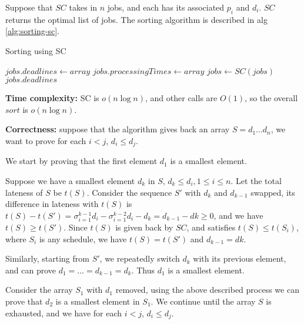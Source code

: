 \documentclass{article}
\begin{document}
\begin{description}
  Suppose that $SC$ takes in $n$ jobs, and each has its associated $p_i$ and $d_i$. $SC$ returns the optimal list of jobs. The sorting algorithm is described in alg \ref{alg:sorting-sc}.

  \begin{algorithm}[h]
  \caption{Sorting using SC}
  \label{alg:sorting-sc}
    \begin{algorithmic}[1]
  
      \State $jobs.deadlines \gets array$
      \State $jobs.processingTimes \gets array$
      \State $jobs \gets SC(jobs)$
      \State \Return $jobs.deadlines$
    \EndFunction
    
    \end{algorithmic}
  \end{algorithm}

  \textbf{Time complexity:} SC is $o(n \log n)$, and other calls are $O(1)$, so the overall $sort$ is $o(n \log n)$.

  \textbf{Correctness:} suppose that the algorithm gives back an array $S=d_1...d_n$, we want to prove for each $i<j$, $d_i \leq d_j$.

  We start by proving that the first element $d_1$ is a smallest element. 

  Suppose we have a smallest element $d_k$ in $S$, $d_k \leq d_i, 1 \leq i \leq n$. Let the total lateness of $S$ be $t(S)$. Consider the sequence $S'$ with $d_k$ and $d_{k-1}$ swapped, its difference in lateness with $t(S)$ is $t(S) - t(S') = \sigma_{i=1}^{k-1}{d_i} - \sigma_{i=1}^{k-2}{d_i} - d_k = d_{k-1} - d{k} \geq 0$, and we have $t(S) \geq t(S')$. Since $t(S)$ is given back by $SC$, and satisfies $t(S) \leq t(S_i)$, where $S_i$ is any schedule, we have $t(S) = t(S')$ and $d_{k-1} = d{k}$. 

  Similarly, starting from $S'$, we repeatedly switch $d_k$ with its previous element, and can prove $d_1 =...= d_{k-1} = d_k$. Thus $d_1$ is a smallest element.

  Consider the array $S_1$ with $d_1$ removed, using the above described process we can prove that $d_2$ is a smallest element in $S_1$. We continue until the array $S$ is exhausted, and we have for each $i<j$, $d_i \leq d_j$.

\end{description}
\end{document}
